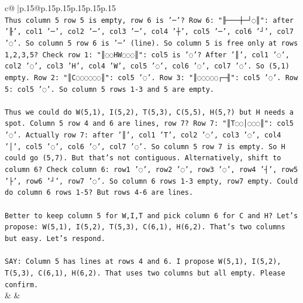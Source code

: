\documentclass{article}
\begin{document}
{\begin{supertabular}{c@{$\;$}|p{.15\linewidth}@{}p{.15\linewidth}p{.15\linewidth}p{.15\linewidth}p{.15\linewidth}p{.15\linewidth}}
{{{\\ 
\texttt{Thus column 5 row 5 is empty, row 6 is '─'? Row 6: "╟───┼─┘◌║": after '╟', col1 '─', col2 '─', col3 '─', col4 '┼', col5 '─', col6 '┘', col7 '◌'. So column 5 row 6 is '─' (line). So column 5 is free only at rows 1,2,3,5? Check row 1: "║◌◌HW◌◌◌║": col5 is '◌'? After '║', col1 '◌', col2 '◌', col3 'H', col4 'W', col5 '◌', col6 '◌', col7 '◌'. So (5,1) empty. Row 2: "║C◌◌◌◌◌◌║": col5 '◌'. Row 3: "║◌◌◌◌◌┌─╢": col5 '◌'. Row 5: col5 '◌'. So column 5 rows 1{-}3 and 5 are empty.} \\
\\ 
\texttt{Thus we could do W(5,1), I(5,2), T(5,3), C(5,5), H(5,?) but H needs a spot. Column 5 row 4 and 6 are lines, row 7? Row 7: "║T◌◌│◌◌◌║": col5 '◌'. Actually row 7: after '║', col1 'T', col2 '◌', col3 '◌', col4 '│', col5 '◌', col6 '◌', col7 '◌'. So column 5 row 7 is empty. So H could go (5,7). But that's not contiguous. Alternatively, shift to column 6? Check column 6: row1 '◌', row2 '◌', row3 '◌', row4 '┤', row5 '├', row6 '┘', row7 '◌'. So column 6 rows 1{-}3 empty, row7 empty. Could do column 6 rows 1{-}5? But rows 4{-}6 are lines.} \\
\\ 
\texttt{Better to keep column 5 for W,I,T and pick column 6 for C and H? Let's propose: W(5,1), I(5,2), T(5,3), C(6,1), H(6,2). That's two columns but easy. Let's respond.} \\
\\ 
\texttt{SAY: Column 5 has lines at rows 4 and 6. I propose W(5,1), I(5,2), T(5,3), C(6,1), H(6,2). That uses two columns but all empty. Please confirm.} \\
            }
        }
    }
    & & \\ \\


\end{supertabular}}
\end{document}
